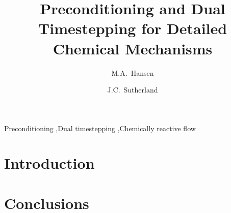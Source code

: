 \documentclass[authoryear,preprint,review,12pt]{elsarticle}
\begin{document}
\begin{frontmatter}
\title{Preconditioning and Dual Timestepping for Detailed Chemical
Mechanisms}

\author[uofu]{M.A.~Hansen}

\author[uofu]{J.C.~Sutherland}

\address[uofu]{University of Utah, Department of Chemical Engineering, 201
President's Circle, Salt Lake City, UT 84112}

\begin{abstract}
\blindtext
\end{abstract}

\begin{keyword}
Preconditioning \sep Dual timestepping \sep Chemically reactive flow
\end{keyword}
\end{frontmatter}

\section{Introduction}
\blindtext

\section{Conclusions}
\blindtext
\end{document}
